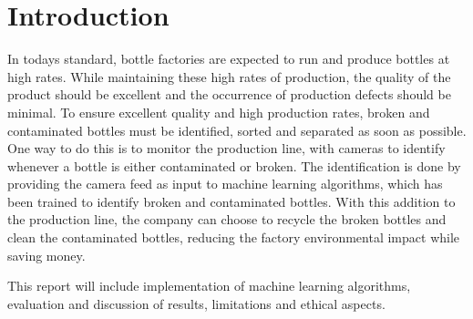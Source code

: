 \section{Introduction}

In todays standard, bottle factories are expected to run and produce bottles at high rates. 
While maintaining these high rates of production, the quality of the product should be excellent and the occurrence of production defects should be minimal.
To ensure excellent quality and high production rates, broken and contaminated bottles must be identified, sorted and separated as soon as possible. 
One way to do this is to monitor the production line, with cameras to identify whenever a bottle is either contaminated or broken. 
The identification is done by providing the camera feed as input to machine learning algorithms, which has been trained to identify broken and contaminated bottles.
With this addition to the production line, the company can choose to recycle the broken bottles and clean the contaminated bottles, reducing the factory environmental impact while saving money.

\par
This report will include implementation of machine learning algorithms, evaluation and discussion of results, limitations and ethical aspects. 